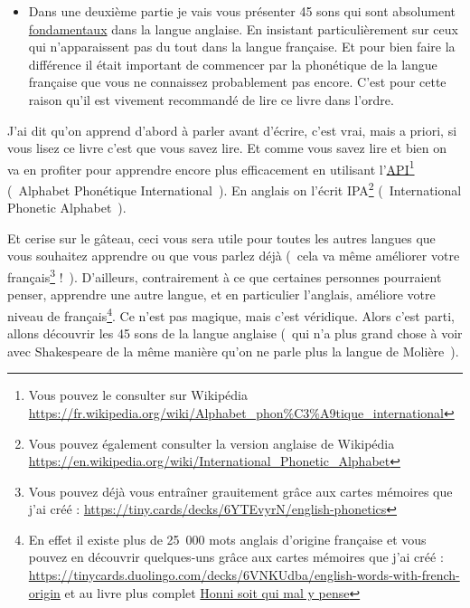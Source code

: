 \begin{itemize}
\item Dans une deuxième partie je vais vous présenter 45 sons qui sont absolument
\underline{fondamentaux} dans la langue anglaise. En insistant
particulièrement sur ceux qui n'apparaissent pas du tout dans la
langue française. Et pour bien faire la différence il était important
de commencer par la phonétique de la langue française que vous ne
connaissez probablement pas encore. C'est pour cette raison qu'il est
vivement recommandé de lire ce livre dans l'ordre.
\end{itemize}
J'ai dit qu'on apprend d'abord à parler avant d'écrire, c'est vrai,
mais a priori, si vous lisez ce livre c'est que vous savez lire. Et
comme vous savez lire et bien on va en profiter pour apprendre encore
plus efficacement en utilisant
l'\href{https://fr.wikipedia.org/wiki/Alphabet\_phon\%25C3\%25A9tique\_international}{API}\footnote{Vous
pouvez le consulter sur Wikipédia \url{https://fr.wikipedia.org/wiki/Alphabet_phon\%C3\%A9tique_international}}
(~Alphabet Phonétique International~). En anglais on l'écrit
IPA\footnote{Vous pouvez également consulter la version anglaise de
  Wikipédia \url{https://en.wikipedia.org/wiki/International_Phonetic_Alphabet}}
(~International Phonetic Alphabet~).\par

Et cerise sur le gâteau, ceci
vous sera utile pour toutes les autres langues que vous souhaitez
apprendre ou que vous parlez déjà (~cela va même améliorer votre
français\footnote{Vous pouvez déjà vous entraîner grauitement grâce
  aux cartes mémoires que j'ai créé : \url{https://tiny.cards/decks/6YTEvyrN/english-phonetics}} !~). D'ailleurs, contrairement à ce que certaines personnes
pourraient penser, apprendre une autre langue, et en particulier
l'anglais, améliore votre niveau de français\footnote{En effet il existe plus de 25~000 mots anglais
  d'origine française et vous pouvez en découvrir quelques-uns grâce
  aux cartes mémoires que j'ai créé :
  \url{https://tinycards.duolingo.com/decks/6VNKUdba/english-words-with-french-origin}
et au livre plus complet \href{https://www.amazon.fr/gp/product/225315444X/ref=as_li_tl?ie=UTF8&camp=1642&creative=6746&creativeASIN=225315444X&linkCode=as2&tag=wwwbecomefree-21&linkId=5317e7b0e063b4d6c7c676b11420e49d}{Honni soit qui mal y pense} }. Ce n'est pas magique,
mais c'est véridique. Alors c'est parti, allons découvrir les 45 sons
de la langue anglaise (~qui n'a plus grand chose à voir avec
Shakespeare de la même manière qu'on ne parle plus la langue de
Molière~).
